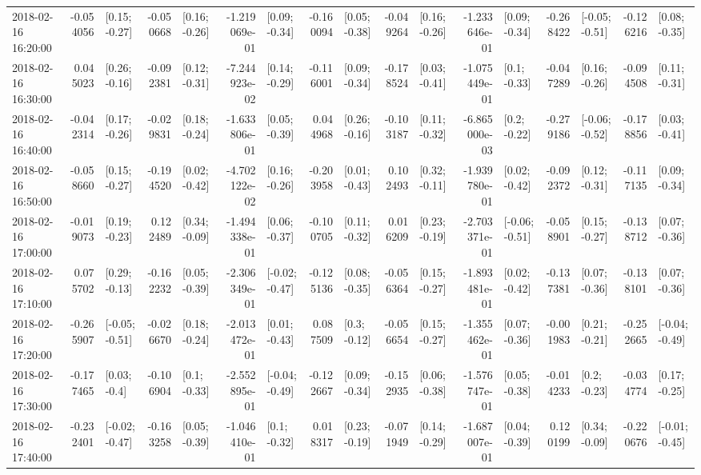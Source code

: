 \begin{tabular}{lrlrlrlrlrlrlrlrl}
2018-02-16 16:20:00 & -0.054056 &   [0.15; -0.27] & -0.050668 &   [0.16; -0.26] & -1.219069e-01 &   [0.09; -0.34] & -0.160094 &   [0.05; -0.38] & -0.049264 &   [0.16; -0.26] & -1.233646e-01 &   [0.09; -0.34] & -0.268422 &  [-0.05; -0.51] & -0.126216 &   [0.08; -0.35] \\
2018-02-16 16:30:00 &  0.045023 &   [0.26; -0.16] & -0.092381 &   [0.12; -0.31] & -7.244923e-02 &   [0.14; -0.29] & -0.116001 &   [0.09; -0.34] & -0.178524 &   [0.03; -0.41] & -1.075449e-01 &    [0.1; -0.33] & -0.047289 &   [0.16; -0.26] & -0.094508 &   [0.11; -0.31] \\
2018-02-16 16:40:00 & -0.042314 &   [0.17; -0.26] & -0.029831 &   [0.18; -0.24] & -1.633806e-01 &   [0.05; -0.39] &  0.044968 &   [0.26; -0.16] & -0.103187 &   [0.11; -0.32] & -6.865000e-03 &    [0.2; -0.22] & -0.279186 &  [-0.06; -0.52] & -0.178856 &   [0.03; -0.41] \\
2018-02-16 16:50:00 & -0.058660 &   [0.15; -0.27] & -0.194520 &   [0.02; -0.42] & -4.702122e-02 &   [0.16; -0.26] & -0.203958 &   [0.01; -0.43] &  0.102493 &   [0.32; -0.11] & -1.939780e-01 &   [0.02; -0.42] & -0.092372 &   [0.12; -0.31] & -0.117135 &   [0.09; -0.34] \\
2018-02-16 17:00:00 & -0.019073 &   [0.19; -0.23] &  0.122489 &   [0.34; -0.09] & -1.494338e-01 &   [0.06; -0.37] & -0.100705 &   [0.11; -0.32] &  0.016209 &   [0.23; -0.19] & -2.703371e-01 &  [-0.06; -0.51] & -0.058901 &   [0.15; -0.27] & -0.138712 &   [0.07; -0.36] \\
2018-02-16 17:10:00 &  0.075702 &   [0.29; -0.13] & -0.162232 &   [0.05; -0.39] & -2.306349e-01 &  [-0.02; -0.47] & -0.125136 &   [0.08; -0.35] & -0.056364 &   [0.15; -0.27] & -1.893481e-01 &   [0.02; -0.42] & -0.137381 &   [0.07; -0.36] & -0.138101 &   [0.07; -0.36] \\
2018-02-16 17:20:00 & -0.265907 &  [-0.05; -0.51] & -0.026670 &   [0.18; -0.24] & -2.013472e-01 &   [0.01; -0.43] &  0.087509 &    [0.3; -0.12] & -0.056654 &   [0.15; -0.27] & -1.355462e-01 &   [0.07; -0.36] & -0.001983 &   [0.21; -0.21] & -0.252665 &  [-0.04; -0.49] \\
2018-02-16 17:30:00 & -0.177465 &    [0.03; -0.4] & -0.106904 &    [0.1; -0.33] & -2.552895e-01 &  [-0.04; -0.49] & -0.122667 &   [0.09; -0.34] & -0.152935 &   [0.06; -0.38] & -1.576747e-01 &   [0.05; -0.38] & -0.014233 &    [0.2; -0.23] & -0.034774 &   [0.17; -0.25] \\
2018-02-16 17:40:00 & -0.232401 &  [-0.02; -0.47] & -0.163258 &   [0.05; -0.39] & -1.046410e-01 &    [0.1; -0.32] &  0.018317 &   [0.23; -0.19] & -0.071949 &   [0.14; -0.29] & -1.687007e-01 &   [0.04; -0.39] &  0.120199 &   [0.34; -0.09] & -0.220676 &  [-0.01; -0.45] \\

\end{tabular}
